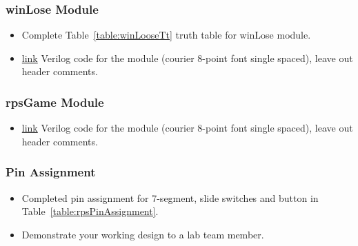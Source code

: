 \subsubsection{winLose Module}
\begin{itemize}
\item Complete Table~\ref{table:winLooseTt} truth table for winLose module.
\item \protect\hyperlink{winLoose_Verilog}{link} Verilog code for the module
(courier 8-point font single spaced), leave out header comments.
\end{itemize}

\subsubsection{rpsGame Module}
\begin{itemize}
\item \protect\hyperlink{play2Seven_Verilog}{link} Verilog code for the module
(courier 8-point font single spaced), leave out header comments.
\end{itemize}

\subsubsection{Pin Assignment}
\begin{itemize}
\item Completed pin assignment for 7-segment, slide switches and button in Table~\ref{table:rpsPinAssignment}.
\item Demonstrate your working design to a lab team member.
\end{itemize}

